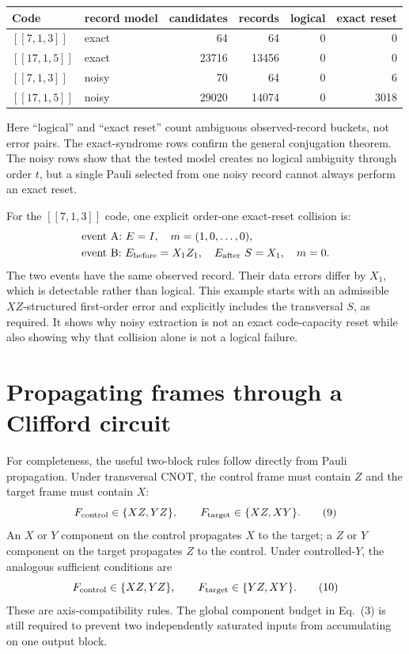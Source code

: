 \documentclass[11pt]{article}
\theoremstyle{remark}
\begin{document}
\begin{center}
\begin{tabular}{@{}llrrrr@{}}
\toprule
Code & record model & candidates & records & logical & exact reset \\
\midrule
$[[7,1,3]]$  & exact & 64    & 64    & 0 & 0 \\
$[[17,1,5]]$ & exact & 23716 & 13456 & 0 & 0 \\
$[[7,1,3]]$  & noisy & 70    & 64    & 0 & 6 \\
$[[17,1,5]]$ & noisy & 29020 & 14074 & 0 & 3018 \\
\bottomrule
\end{tabular}
\end{center}
Here ``logical'' and ``exact reset'' count ambiguous observed-record
buckets, not error pairs.  The exact-syndrome rows confirm the general
conjugation theorem.  The noisy rows show that the tested model creates no
logical ambiguity through order $t$, but a single Pauli selected from one
noisy record cannot always perform an exact reset.

For the $[[7,1,3]]$ code, one explicit order-one exact-reset collision is:
\begin{align*}
 &\text{event A: } E=I,\quad m=(1,0,\ldots,0),\\
 &\text{event B: } E_{\rm before}=X_1Z_1,\quad
   E_{\rm after\ }S=X_1,\quad m=0.
\end{align*}
The two events have the same observed record.  Their data errors differ by
$X_1$, which is detectable rather than logical.  This example starts with
an admissible $XZ$-structured first-order error and explicitly includes the
transversal $S$, as required.  It shows why noisy extraction is not an exact
code-capacity reset while also showing why that collision alone is not a
logical failure.

\section{Propagating frames through a Clifford circuit}

For completeness, the useful two-block rules follow directly from Pauli
propagation.  Under transversal CNOT, the control frame must contain $Z$ and
the target frame must contain $X$:
\[
 F_{\rm control}\in\{XZ,YZ\},\qquad
 F_{\rm target}\in\{XZ,XY\}.
 \tag{9}
\]
An $X$ or $Y$ component on the control propagates $X$ to the target; a $Z$
or $Y$ component on the target propagates $Z$ to the control.  Under
controlled-$Y$, the analogous sufficient conditions are
\[
 F_{\rm control}\in\{XZ,YZ\},\qquad
 F_{\rm target}\in\{YZ,XY\}.
 \tag{10}
\]
These are axis-compatibility rules.  The global component budget in
Eq.~(3) is still required to prevent two independently saturated inputs
from accumulating on one output block.
\end{document}
